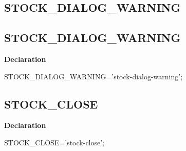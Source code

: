 \documentclass{report}
\newif\ifpdf
\begin{document}
\subsection*{\large{\textbf{STOCK{\_}DIALOG{\_}WARNING}}\normalsize\hspace{1ex}\hrulefill}
\else
\subsection*{STOCK{\_}DIALOG{\_}WARNING}
\fi
\label{common-STOCK_DIALOG_WARNING}
\begin{list}{}{
\setlength{\itemindent}{0cm}
\setlength{\listparindent}{0cm}
\setlength{\leftmargin}{\evensidemargin}
\addtolength{\leftmargin}{\tmplength}
\settowidth{\labelsep}{X}
\addtolength{\leftmargin}{\labelsep}
\setlength{\labelwidth}{\tmplength}
}
\item[\textbf{Declaration}\hfill]
\ifpdf
\begin{flushleft}
\fi
\begin{ttfamily}
STOCK{\_}DIALOG{\_}WARNING='stock-dialog-warning';\end{ttfamily}

\ifpdf
\end{flushleft}
\fi

\end{list}
\ifpdf
\subsection*{\large{\textbf{STOCK{\_}CLOSE}}\normalsize\hspace{1ex}\hrulefill}
\else
\subsection*{STOCK{\_}CLOSE}
\fi
\label{common-STOCK_CLOSE}
\begin{list}{}{
\setlength{\itemindent}{0cm}
\setlength{\listparindent}{0cm}
\setlength{\leftmargin}{\evensidemargin}
\addtolength{\leftmargin}{\tmplength}
\settowidth{\labelsep}{X}
\addtolength{\leftmargin}{\labelsep}
\setlength{\labelwidth}{\tmplength}
}
\item[\textbf{Declaration}\hfill]
\ifpdf
\begin{flushleft}
\fi
\begin{ttfamily}
STOCK{\_}CLOSE='stock-close';\end{ttfamily}

\ifpdf
\end{flushleft}
\fi

\end{list}
\ifpdf
\end{document}
